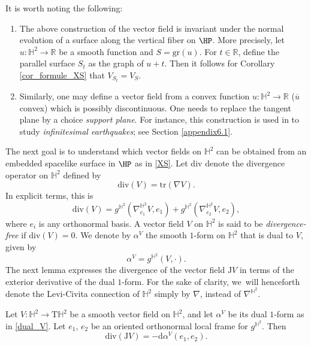 \begin{remark}
It is worth noting the following:
\begin{enumerate}
\item The above construction of the vector field is invariant under the normal evolution of a surface along the vertical fiber on $\HP$. More precisely, let $u:\mathbb{H}^2\to\mathbb{R}$ be a smooth function and $S=\mathrm{gr}(u)$. For $t\in\mathbb{R}$, define the parallel surface $S_t$ as the graph of $u+t$. Then it follows for Corollary \ref{cor_formule_XS} that $V_{S_t}=V_S$.
\item Similarly, one may define a vector field from a convex function $u:\mathbb{H}^2\to\mathbb{R}$ (\ie $\overline{u}$ convex) which is possibly discontinuous. One needs to replace the tangent plane by a choice \emph{support plane}. For instance, this construction is used in \cite{diaf2023Infearth} to study \emph{infinitesimal earthquakes}; see Section \ref{appendix6.1}.
\end{enumerate}
\end{remark}
The next goal is to understand which vector fields on $\mathbb{H}^2$ can be obtained from an embedded spacelike surface in $\HP$ as in \eqref{XS}. Let $\mathrm{div}$ denote the divergence operator on $\mathbb{H}^2$ defined by
\[
\mathrm{div}(V)=\mathrm{tr}(\nabla V).
\]
In explicit terms, this is
\begin{equation}\label{formula_divergence}
\mathrm{div}(V)=g^{\mathbb{H}^2}(\nabla^{\mathbb{H}^2}_{e_1}V,e_1)+g^{\mathbb{H}^2}(\nabla^{\mathbb{H}^2}_{e_2}V,e_2),
\end{equation} where $e_i$ is any orthonormal basis. A vector field \(V \) on \(\mathbb{H}^2 \) is said to be \emph{divergence-free} if \(\mathrm{div}(V) = 0 \).
We denote by \(\alpha^V \) the smooth $1$-form on \(\mathbb{H}^2 \) that is dual to \(V \), given by
\begin{equation}\label{dual_V}
\alpha^V = g^{\mathbb{H}^2}(V, \cdot).
\end{equation}
The next lemma expresses the divergence of the vector field \(\mathrm{J}V \) in terms of the exterior derivative of the dual $1$-form.
For the sake of clarity, we~will henceforth denote the Levi-Civita connection of \(\mathbb{H}^2 \) simply by \(\nabla \), instead of \(\nabla^{\mathbb{H}^2} \).

\begin{lemma}\label{divergence_in_terms_of_forms}
Let \(V: \mathbb{H}^2 \to \mathrm{T}\mathbb{H}^2 \) be a smooth vector field on \(\mathbb{H}^2 \), and let \(\alpha^V \) be its dual $1$-form as in \eqref{dual_V}.
Let \(e_1 \), \(e_2 \) be an oriented orthonormal local frame for \(g^{\mathbb{H}^2} \). Then
\[
\mathrm{div}(\mathrm{J}V) =- \mathrm{d} \alpha^V(e_1, e_2).
\]
\end{lemma}

